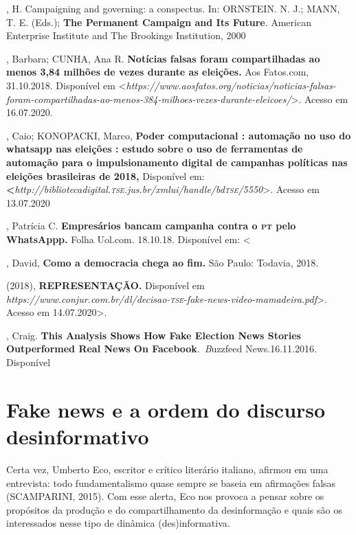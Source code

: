 \begin{bibliohedra}
, H. Campaigning and governing: a conspectus. In: ORNSTEIN. N. J.;
MANN, T. E. (Eds.); \textbf{The Permanent Campaign and Its Future}.
American Enterprise Institute and The Brookings Institution, 2000

, Barbara; CUNHA, Ana R. \textbf{Notícias falsas foram
compartilhadas ao menos 3,84 milhões de vezes durante as eleições.} Aos
Fatos.com, 31.10.2018. Disponível em
\textless{}\textit{https://www.aosfatos.org/noticias/noticias-falsas-foram-compartilhadas-ao-menos-384-milhoes-vezes-durante-eleicoes/}\textgreater{}.
Acesso em 16.07.2020.

, Caio; KONOPACKI, Marco, \textbf{Poder computacional : automação
no uso do whatsapp nas eleições : estudo sobre o uso de ferramentas de
automação para o impulsionamento digital de campanhas políticas nas
eleições brasileiras de 2018,} Disponível em:
\textbf{\textless{}}\textit{http://bibliotecadigital.\textsc{tse}.jus.br/xmlui/handle/bd\textsc{tse}/5550}\textgreater{}.
Acesso em 13.07.2020

, Patrícia C. \textbf{Empresários bancam campanha contra o \textsc{pt} pelo
WhatsAppp.} Folha Uol.com. 18.10.18. Disponível em: \textless{}

, David, \textbf{Como a democracia chega ao fim.} São Paulo:
Todavia, 2018.

 (2018), \textbf{REPRESENTAÇÃO.} Disponível
em
\textit{https://www.conjur.com.br/dl/decisao-\textsc{tse}-fake-news-video-mamadeira.pdf}\textgreater{}.
Acesso em 14.07.2020\textgreater{}.

, Craig. \textbf{This Analysis Shows How Fake Election News
Stories Outperformed Real News On Facebook}.~\textit{B}uzzfeed
News.16.11.2016. Disponível
\end{bibliohedra}

\chapter{Fake news e a ordem do discurso\\desinformativo}


Certa vez, Umberto Eco, escritor e crítico literário italiano, afirmou
em uma entrevista: todo fundamentalismo quase sempre se baseia em
afirmações falsas (SCAMPARINI, 2015). Com esse alerta, Eco nos provoca a
pensar sobre os propósitos da produção e do compartilhamento da
desinformação e quais são os interessados nesse tipo de dinâmica (des)informativa.

